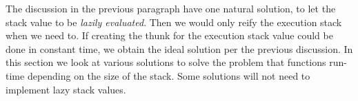 The discussion in the previous paragraph have one natural solution, to
let the stack value to be \emph{lazily evaluated}. Then we would only
reify the execution stack when we need to. If creating the thunk for
the execution stack value could be done in constant time, we obtain the
ideal solution per the previous discussion. In this section we look at
various solutions to solve the problem that functions run-time depending
on the size of the stack. Some solutions will not need to implement
lazy stack values.
